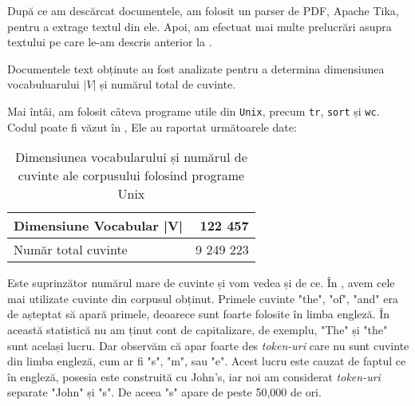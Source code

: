 După ce am descărcat documentele, am folosit un parser de PDF, Apache Tika, pentru a extrage textul din ele. Apoi, am efectuat mai multe prelucrări asupra textului pe care le-am descris anterior la .

Documentele text obținute au fost analizate pentru a determina dimensiunea vocabuluarului $|V|$ și numărul total de cuvinte.

Mai întâi, am folosit câteva programe utile din \texttt{Unix}, precum \texttt{tr}, \texttt{sort} și \texttt{wc}. Codul poate fi văzut în , Ele au raportat următoarele date:

\begin{center}
\begin{table}[htb]
  \caption{Dimensiunea vocabularului și numărul de cuvinte ale corpusului folosind programe Unix}
  \begin{tabular}{|l|r|}
    \hline
    Dimensiune Vocabular |V| & 122 457\\
    \hline
    Număr total cuvinte & 9 249 223 \\
     \hline
  \end{tabular}
  \label{table:vocabulary-size-bash}
\end{table}
\end{center}


\lstset{language=bash}
\lstset{caption=Comenzile Unix folosite pentru determinarea vocabularului, label=lst:vocabulary-size-bash}


Este suprinzător numărul mare de cuvinte și vom vedea și de ce. În , avem cele mai utilizate cuvinte din corpusul obținut. Primele cuvinte "the", "of", "and" era de așteptat să apară primele, deoarece sunt foarte folosite în limba engleză. În această statistică nu am ținut cont de capitalizare, de exemplu, "The" și "the" sunt același lucru. Dar observăm că apar foarte des \textit{token-uri} care nu sunt cuvinte din limba engleză, cum ar fi "s", "m", sau "e". Acest lucru este cauzat de faptul ce în engleză, posesia este construită cu John's, iar noi am considerat \textit{token-uri} separate "John" și "s". De aceea "s" apare de peste 50,000 de ori.

\lstset{language=make}
\lstset{caption=Cele mai folosite cuvinte din limba engleză pentru corpusul obținut folosind programe Unix, label=lst:top-words-bash}


